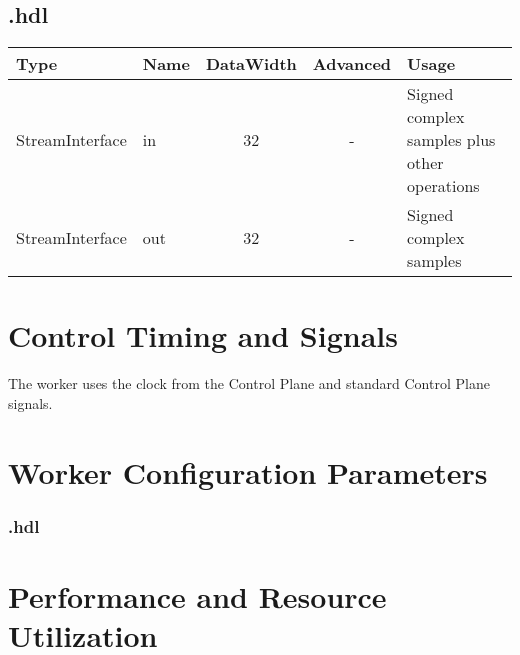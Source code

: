 \begin{landscape}
	\subsection*{\comp.hdl}
	\begin{scriptsize}
		\begin{tabular}{|M{2cm}|M{1.5cm}|c|c|M{12cm}|}
			\hline
			Type            & Name & DataWidth & Advanced   & Usage                                    		\\
			\hline
			StreamInterface & in   & 32        & - 			& Signed complex samples plus other operations	\\
			\hline
			StreamInterface & out  & 32        & - 			& Signed complex samples 						\\
			\hline
		\end{tabular}
	\end{scriptsize}
\end{landscape}

\section*{Control Timing and Signals}
\begin{flushleft}
	The \comp worker{} uses the clock from the Control Plane and standard Control Plane signals.\\
\end{flushleft}

\begin{landscape}
\section*{Worker Configuration Parameters}
\subsubsection*{\comp.hdl}
%
\section*{Performance and Resource Utilization}
%
\end{landscape}

